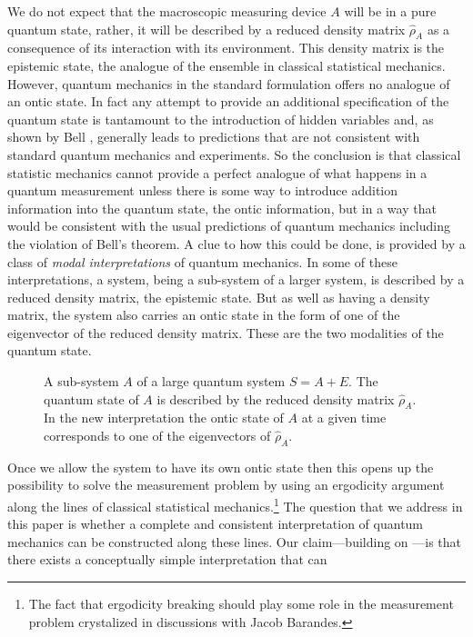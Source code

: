 \documentclass[%
preprint,
nofootinbib,
 amsmath,amssymb,
aps,
]{revtex4-1}
\newcommand{\Tr}{\operatorname{Tr}}
\def\bra#1{\langle #1|}
\def\ket#1{| #1\rangle}
\begin{document}
We do not expect that the macroscopic measuring device $A$ will be in a pure quantum state, rather, it will be described by a reduced density matrix $\hat\rho_A$ as a consequence of its interaction with its environment. This density matrix is the epistemic state, the analogue of the ensemble in classical statistical mechanics. However, quantum mechanics in the standard formulation offers no analogue of an ontic state. In fact
any attempt to provide an additional specification of the quantum state is tantamount to the introduction of hidden variables and, as shown by Bell \cite{Bell:1964oeprp}, generally leads to
predictions that are not consistent with standard quantum mechanics and experiments.
So the conclusion is that classical statistic mechanics cannot provide a perfect analogue of what happens in a quantum measurement unless there is some way to introduce addition information into the quantum state, the ontic information, but in a way that would be consistent with the usual predictions of quantum mechanics including the violation of Bell's theorem.
A clue to how this could be done, is provided by a class of {\it modal interpretations\/} of quantum mechanics. In some of these interpretations, a system, being a sub-system of a larger system, is described by a reduced density matrix, the epistemic state. But as well as having a density matrix, the system also carries an ontic state in the form of one of the eigenvector of the reduced density matrix. These are the two modalities of the quantum state.
\begin{figure}[ht]
\begin{center}
\end{center}
\caption{\small A sub-system $A$ of a large quantum system $S=A+E$. The quantum state of $A$ is described by the reduced density matrix $\hat\rho_A$. In the new interpretation the ontic state of $A$ at a given time corresponds to one of the eigenvectors of $\hat\rho_A$.}
\label{f1}
\end{figure}
Once we allow the system to have its own ontic state then this opens up the possibility to solve the measurement problem by using an ergodicity argument along the lines of classical statistical mechanics.\footnote{The fact that ergodicity breaking should play some role in the measurement 
problem crystalized in discussions with Jacob Barandes.} The question that we address in this paper is whether a complete and consistent interpretation of quantum mechanics can be constructed along these lines. Our claim---building on \cite{Hollowood:2013cbr}---is that there exists a conceptually simple interpretation that can  
\end{document}
